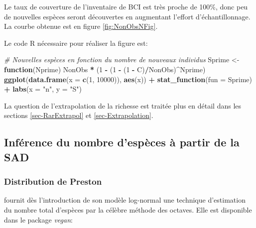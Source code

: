 \documentclass[
  11pt,
  french,
  a4paper,
  extrafontsizes,onecolumn,openright
  ]{memoir}
\newenvironment{Shaded}{\begin{snugshade}}{\end{snugshade}}
\newcommand{\AttributeTok}[1]{\textcolor[rgb]{0.13,0.29,0.53}{#1}}
\newcommand{\CommentTok}[1]{\textcolor[rgb]{0.56,0.35,0.01}{\textit{#1}}}
\newcommand{\ControlFlowTok}[1]{\textcolor[rgb]{0.13,0.29,0.53}{\textbf{#1}}}
\newcommand{\DecValTok}[1]{\textcolor[rgb]{0.00,0.00,0.81}{#1}}
\newcommand{\FunctionTok}[1]{\textcolor[rgb]{0.13,0.29,0.53}{\textbf{#1}}}
\newcommand{\NormalTok}[1]{#1}
\newcommand{\OtherTok}[1]{\textcolor[rgb]{0.56,0.35,0.01}{#1}}
\newcommand{\SpecialCharTok}[1]{\textcolor[rgb]{0.81,0.36,0.00}{\textbf{#1}}}
\newcommand{\StringTok}[1]{\textcolor[rgb]{0.31,0.60,0.02}{#1}}
\begin{document}
\normalsize

Le taux de couverture de l'inventaire de BCI est très proche de 100\%, donc peu de nouvelles espèces seront découvertes en augmentant l'effort d'échantillonnage.
La courbe obtenue est en figure \ref{fig:NonObsNFig}.

Le code R nécessaire pour réaliser la figure est:

\scriptsize

\begin{Shaded}
\begin{Highlighting}[]
\CommentTok{\# Nouvelles espèces en fonction du nombre de nouveaux individus}
\NormalTok{Sprime }\OtherTok{\textless{}{-}} \ControlFlowTok{function}\NormalTok{(Nprime) NonObs }\SpecialCharTok{*}\NormalTok{ (}\DecValTok{1} \SpecialCharTok{{-}}\NormalTok{ (}\DecValTok{1} \SpecialCharTok{{-}}\NormalTok{ (}\DecValTok{1} \SpecialCharTok{{-}}\NormalTok{ C)}\SpecialCharTok{/}\NormalTok{NonObs)}\SpecialCharTok{\^{}}\NormalTok{Nprime)}
\FunctionTok{ggplot}\NormalTok{(}\FunctionTok{data.frame}\NormalTok{(}\AttributeTok{x =} \FunctionTok{c}\NormalTok{(}\DecValTok{1}\NormalTok{, }\DecValTok{10000}\NormalTok{)), }\FunctionTok{aes}\NormalTok{(x)) }\SpecialCharTok{+} 
  \FunctionTok{stat\_function}\NormalTok{(}\AttributeTok{fun =}\NormalTok{ Sprime) }\SpecialCharTok{+}
  \FunctionTok{labs}\NormalTok{(}\AttributeTok{x =} \StringTok{"n\textquotesingle{}"}\NormalTok{, }\AttributeTok{y =} \StringTok{"S\textquotesingle{}"}\NormalTok{)}
\end{Highlighting}
\end{Shaded}

\normalsize

La question de l'extrapolation de la richesse est traitée plus en détail dans les sections \ref{sec-RarExtrapol} et \ref{sec-Extrapolation}.

\subsection{Inférence du nombre d'espèces à partir de la SAD}\label{infuxe9rence-du-nombre-despuxe8ces-uxe0-partir-de-la-sad}

\subsubsection{Distribution de Preston}\label{distribution-de-preston}

\textcite{Preston1948} fournit dès l'introduction de son modèle log-normal une technique d'estimation du nombre total d'espèces par la célèbre méthode des octaves.
Elle est disponible dans le package \emph{vegan}:
\end{document}
